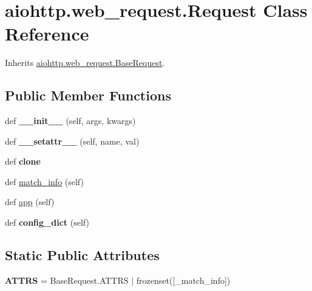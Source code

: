 \hypertarget{classaiohttp_1_1web__request_1_1_request}{}\section{aiohttp.\+web\+\_\+request.\+Request Class Reference}
\label{classaiohttp_1_1web__request_1_1_request}


Inherits \hyperlink{classaiohttp_1_1web__request_1_1_base_request}{aiohttp.\+web\+\_\+request.\+Base\+Request}.

\subsection*{Public Member Functions}
\begin{DoxyCompactItemize}
\item 
\mbox{\label{classaiohttp_1_1web__request_1_1_request_a35897981b0bbfc029e6440b331267380}} 
def {\bfseries \+\_\+\+\_\+init\+\_\+\+\_\+} (self, args, kwargs)
\item 
\mbox{\label{classaiohttp_1_1web__request_1_1_request_ab35bd8f24e0e2b61d8c04150e8c19da9}} 
def {\bfseries \+\_\+\+\_\+setattr\+\_\+\+\_\+} (self, name, val)
\item 
\mbox{\label{classaiohttp_1_1web__request_1_1_request_a0d30374f9d04671a138cb476fcc2f35b}} 
def {\bfseries clone}
\item 
def \hyperlink{classaiohttp_1_1web__request_1_1_request_a15c4b2fa0edea3b3d71646739ebc1d88}{match\+\_\+info} (self)
\item 
def \hyperlink{classaiohttp_1_1web__request_1_1_request_ae32ffb42208ec9db389968ffee60f1a2}{app} (self)
\item 
\mbox{\label{classaiohttp_1_1web__request_1_1_request_a160ab9225b3c93fc8dcb889e9bb5b71a}} 
def {\bfseries config\+\_\+dict} (self)
\end{DoxyCompactItemize}
\subsection*{Static Public Attributes}
\begin{DoxyCompactItemize}
\item 
\mbox{\label{classaiohttp_1_1web__request_1_1_request_a993270016d7c5f1d16407f829fce726a}} 
{\bfseries A\+T\+T\+RS} = Base\+Request.\+A\+T\+T\+RS $\vert$ frozenset(\mbox{[}\textquotesingle{}\+\_\+match\+\_\+info\textquotesingle{}\mbox{]})
\end{DoxyCompactItemize}
